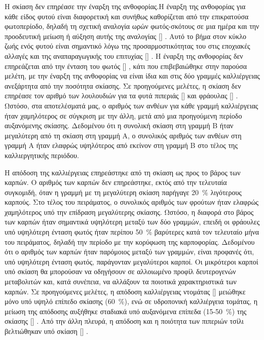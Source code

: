 \documentclass[12pt, a4paper]{report} %
\DeclareRobustCommand{\lcitep}[1]{%
  \english{[\cite{#1}]}%
}
\newcommand{\english}{\foreignlanguage{english}}
\begin{document}
Η σκίαση δεν επηρέασε την έναρξη της ανθοφορίας.Η έναρξη της ανθοφορίας για κάθε είδος φυτού είναι διαφορετική και συνήθως 
καθορίζεται από την επικρατούσα φωτοπερίοδο, δηλαδή τη σχετική αναλογία ωρών φωτός-σκότους σε μια ημέρα και την προοδευτική 
μείωση ή αύξηση αυτής της αναλογίας \lcitep{strawberries_bib22}. Αυτό το βήμα στον κύκλο ζωής ενός φυτού είναι σημαντικό λόγω 
της προσαρμοστικότητας του στις εποχιακές αλλαγές και της αναπαραγωγικής του επιτυχίας \lcitep{strawberries_bib23}. 
Η έναρξη της ανθοφορίας δεν επηρεάζεται από την ένταση του φωτός \lcitep{strawberries_bib22}, κάτι που επιβεβαιώθηκε στην 
παρούσα μελέτη, με την έναρξη της ανθοφορίας να είναι ίδια και στις δύο γραμμές καλλιέργειας ανεξάρτητα από την ποσότητα 
σκίασης. Σε προηγούμενες μελέτες, η σκίαση δεν επηρέασε τον αριθμό των λουλουδιών για τα φυτά πιπεριάς 
\lcitep{strawberries_bib24} και φράουλας \lcitep{strawberries_bib25}. Ωστόσο, στα αποτελέσματά μας, ο αριθμός των ανθέων 
για κάθε γραμμή καλλιέργειας ήταν χαμηλότερος σε σύγκριση με την άλλη, μετά από μια προηγούμενη περίοδο αυξανόμενης σκίασης. 
Δεδομένου ότι η συνολική σκίαση στη γραμμή Β ήταν μεγαλύτερη από τη σκίαση στη γραμμή Α, ο συνολικός αριθμός των ανθέων στη 
γραμμή Α ήταν ελαφρώς υψηλότερος από εκείνον στη γραμμή Β στο τέλος της καλλιεργητικής περιόδου.

Η απόδοση της καλλιέργειας επηρεάστηκε από τη σκίαση ως προς το βάρος των καρπών. Ο αριθμός των καρπών δεν επηρεάστηκε, 
εκτός από την τελευταία συγκομιδή, όταν η γραμμή με τη μεγαλύτερη σκίαση παρήγαγε \SI{20}{\percent} λιγότερους καρπούς. 
Στο τέλος του πειράματος, ο συνολικός αριθμός των φρούτων ήταν ελαφρώς χαμηλότερος υπό την επίδραση μεγαλύτερης σκίασης. 
Ωστόσο, η διαφορά στο βάρος των καρπών ήταν σημαντικά υψηλότερη μεταξύ των δύο γραμμών, επειδή οι φράουλες υπό υψηλότερη 
ένταση φωτός ήταν περίπου \SI{50}{\percent} βαρύτερες κατά τον τελευταίο μήνα του πειράματος, δηλαδή την περίοδο με την 
κορύφωση της καρποφορίας. Δεδομένου ότι ο αριθμός των καρπών ήταν παρόμοιος μεταξύ των γραμμών, είναι προφανές ότι, υπό 
υψηλότερη ένταση φωτός, παράγονταν μεγαλύτεροι καρποί. Οι μικρότεροι καρποί υπό σκίαση θα μπορούσαν να οδηγήσουν σε 
αλλοιωμένο προφίλ δευτερογενών μεταβολιτών και, κατά συνέπεια, να αλλάξουν τα ποιοτικά χαρακτηριστικά των καρπών. Σε 
προηγούμενες μελέτες, η απόδοση καλλιέργειας ντομάτας \lcitep{strawberries_bib26} μειώθηκε μόνο υπό υψηλό επίπεδο σκίασης 
(\SI{60}{\percent}), ενώ σε υδροπονική καλλιέργεια τομάτας, η μείωση της απόδοσης αυξήθηκε σταδιακά υπό αυξανόμενα επίπεδα 
(15-\SI{50}{\percent}) της σκίασης \lcitep{strawberries_bib16}. Από την άλλη πλευρά, η απόδοση και η ποιότητα των πιπεριών 
τσίλι βελτιώθηκαν υπό σκίαση \lcitep{strawberries_bib24}.
\end{document}
